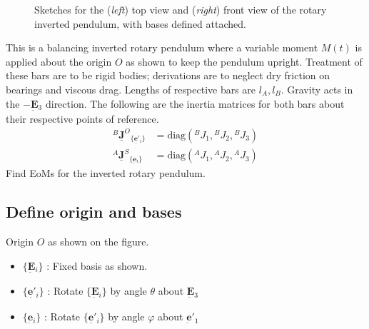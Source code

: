 \documentclass[12pt]{article}
\newcommand{\vb}[1]{{\underset{\tilde{}}{\mathbf{#1}}}}
\newcommand{\mb}[1]{\underline{\mathbf{#1}}}
\newcommand{\bas}[1]{\{ \vb{#1}{}_i \}}
\begin{document}
\begin{figure} [H]
\caption{Sketches for the (\textit{left}) top view and (\textit{right}) front view of the rotary inverted pendulum, with bases defined attached.}
\end{figure}

\vspace{0.5cm}

This is a balancing inverted rotary pendulum where a variable moment $M(t)$ is applied about the origin $O$ as shown to keep the pendulum upright. Treatment of these bars are to be rigid bodies; derivations are to neglect dry friction on bearings and viscous drag. Lengths of respective bars are $l{}_A, l{}_B$. Gravity acts in the $-\vb{E}{}_3$ direction. The following are the inertia matrices for both bars about their respective points of reference.
\[
\begin{aligned}
    {}^B\mb{J}^O{}_{\bas{e'}} &= \text{diag}({}^B J{}_1, {}^B J{}_2, {}^B J{}_3) \\
    {}^A\mb{J}^S{}_{\bas{e}} &= \text{diag}({}^A J{}_1, {}^A J{}_2, {}^A J{}_3)
\end{aligned}
\]
Find EoMs for the inverted rotary pendulum.

\subsection{Define origin and bases}
Origin $O$ as shown on the figure. 
\begin{itemize}
    \item $\bas{E}$ : Fixed basis as shown.
    \item $\bas{e'}$ : Rotate $\bas{E}$ by angle $\theta$ about $\vb{E}{}_3$
    \item $\bas{e}$ : Rotate $\bas{e'}$ by angle $\varphi$ about $\vb{e}'{}_1$
\end{itemize}
\end{document}
